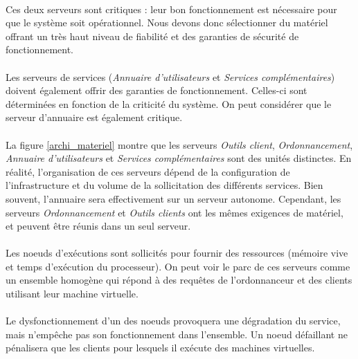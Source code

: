 \paragraph{} Ces deux serveurs sont critiques : leur bon fonctionnement est
nécessaire pour que le système soit opérationnel. Nous devons donc sélectionner
du matériel offrant un très haut niveau de fiabilité et des garanties de
sécurité de fonctionnement.

\paragraph{} Les serveurs de services (\emph{Annuaire d'utilisateurs} et
\emph{Services complémentaires}) doivent également offrir des garanties de
fonctionnement. Celles-ci sont déterminées en fonction de la criticité du
système. On peut considérer que le serveur d'annuaire est également critique.

\paragraph{} La figure \ref{archi_materiel} montre que les serveurs \emph{Outils
client}, \emph{Ordonnancement}, \emph{Annuaire d'utilisateurs} et \emph{Services
complémentaires} sont des unités distinctes. En réalité, l'organisation de ces
serveurs dépend de la configuration de l'infrastructure et du volume de la
sollicitation des différents services. Bien souvent, l'annuaire sera
effectivement sur un serveur autonome. Cependant, les serveurs
\emph{Ordonnancement} et \emph{Outils clients} ont les mêmes exigences de
matériel, et peuvent être réunis dans un seul serveur.

\paragraph{} Les noeuds d'exécutions sont sollicités pour fournir des ressources
(mémoire vive et temps d'exécution du processeur). On peut voir le parc de ces
serveurs comme un ensemble homogène qui répond à des requêtes de l'ordonnanceur
et des clients utilisant leur machine virtuelle.

\paragraph{} Le dysfonctionnement d'un des noeuds provoquera une dégradation du
service, mais n'empêche pas son fonctionnement dans l'ensemble. Un noeud
défaillant ne pénalisera que les clients pour lesquels il exécute des machines
virtuelles.

